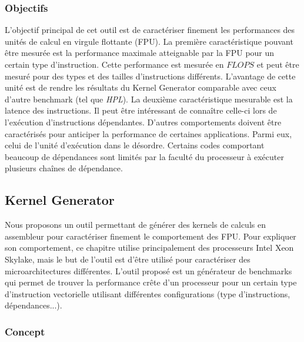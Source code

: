        
 
        

    
    \subsubsection{Objectifs}
    
        L'objectif principal de cet outil est de caractériser finement les performances des unités de calcul en virgule flottante (FPU).
        La première caractéristique pouvant être mesurée est la performance maximale atteignable par la FPU pour un certain type d'instruction. Cette performance est mesurée en $FLOPS$ et peut être mesuré pour des types et des tailles d'instructions différents. L'avantage de cette unité est de rendre les résultats du Kernel Generator comparable avec ceux d'autre benchmark (tel que \textit{HPL}). 
        La deuxième caractéristique mesurable est la latence des instructions. Il peut être intéressant de connaître celle-ci lors de l'exécution d'instructions dépendantes.
        D'autres comportements doivent être caractérisés pour anticiper la performance de certaines applications. Parmi eux, celui de l'unité d'exécution dans le désordre. Certains codes comportant beaucoup de dépendances sont limités par la faculté du processeur à exécuter plusieurs chaînes de dépendance.


        
\subsection{Kernel Generator}    

        Nous proposons un outil permettant de générer des kernels de calculs en assembleur pour caractériser finement le comportement des FPU. Pour expliquer son comportement, ce chapitre utilise principalement des processeurs Intel Xeon Skylake, mais le but de l'outil est d'être utilisé pour caractériser des microarchitectures différentes. 
        L'outil proposé est un générateur de benchmarks qui permet de trouver la performance crête d'un processeur pour un certain type d'instruction vectorielle utilisant différentes configurations (type d'instructions, dépendances...).
        
        

    \subsubsection{Concept}


